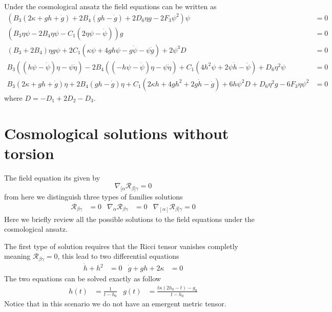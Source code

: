 \documentclass[10pt,a4paper]{article}
\begin{document}
Under the cosmological ansatz the field equations can be written as
\begin{align*}
  \left(B_3(2 \kappa+g h+\dot{g})+2 B_4(g h-\dot{g})+2 D_6 \eta g-2 F_3 \psi^2\right) \psi & =0 \\
  \left(B_3 \eta \psi-2 B_4 \eta \psi-C_1(2 \eta \psi-\dot{\psi})\right) g & = 0 \\
  \left(B_3+2 B_4\right) \eta g \psi+2 C_1(\kappa \psi+4 g h \psi-g \dot{\psi}-\psi \dot{g})+2 \psi^3D & = 0 \\
  B_3((h \psi-\dot{\psi}) \eta-\psi \dot{\eta})-2 B_4((-h \psi-\dot{\psi}) \eta-\psi \dot{\eta})+C_1\left(4 h^2 \psi+2 \psi \dot{h}-\ddot{\psi}\right)+D_6 \eta^2 \psi & =0 \\
  B_3(2 \kappa+g h+\dot{g}) \eta+2 B_4(g h-\dot{g}) \eta+C_1\left(2 \kappa h+4 g h^2+2 g \dot{h}-\ddot{g}\right)+6 h \psi^2D+D_6 \eta^2 g-6 F_3 \eta \psi^2 & =0
\end{align*}
where $D = -D_1+2 D_2-D_3$.


\section{Cosmological solutions without torsion}

The field equation its given by 
\begin{equation}
  \nabla_{[\alpha}\mathcal{R}_{\beta]\gamma} = 0
\end{equation}
from here we distinguish three types of families solutions
\begin{align}
  \mathcal{R}_{\beta\gamma} & = 0 & \nabla_{\alpha}\mathcal{R}_{\beta\gamma} & = 0 & \nabla_{[\alpha]}\mathcal{R}_{\beta]\gamma} = 0
\end{align}
Here we briefly review all the possible solutions to the field equations under the cosmological ansatz.

The first type of solution requires that the Ricci tensor vanishes completly meaning $\mathcal{R}_{\beta\gamma} = 0$, this lead to two
differential equations
\begin{align}
  \dot{h} + h^2 & = 0 & \dot{g} + gh + 2\kappa & = 0
\end{align}
The two equations can be solved exactly as follow
\begin{align}
  h(t) & = \frac{1}{t - h_0} & g(t) & =  \frac{t\kappa\left(2h_0 - t\right) - g_0}{t - h_0}
\end{align}
Notice that in this scenario we do not have an emergent metric tensor.
\end{document}
